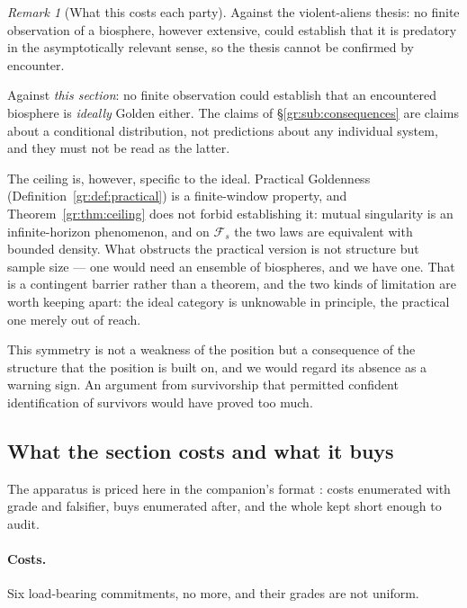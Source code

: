 \documentclass[11pt]{article}
\numberwithin{equation}{section}
\theoremstyle{plain}
\theoremstyle{definition}
\theoremstyle{remark}
\newtheorem{remark}[theorem]{Remark}
\begin{document}
\begin{remark}[What this costs each party]\label{gr:rem:evenhanded}
Against the violent-aliens thesis: no finite observation of a biosphere,
however extensive, could establish that it is predatory in the
asymptotically relevant sense, so the thesis cannot be confirmed by
encounter.

Against \emph{this section}: no finite observation could establish that
an encountered biosphere is \emph{ideally} Golden either. The claims of
\S\ref{gr:sub:consequences} are claims about a conditional
distribution, not predictions about any individual system, and they must
not be read as the latter.

The ceiling is, however, specific to the ideal. Practical Goldenness
(Definition~\ref{gr:def:practical}) is a finite-window property, and
Theorem~\ref{gr:thm:ceiling} does not forbid establishing it: mutual
singularity is an infinite-horizon phenomenon, and on $\mathcal F_s$ the
two laws are equivalent with bounded density. What obstructs the
practical version is not structure but sample size --- one would need an
ensemble of biospheres, and we have one. That is a contingent barrier
rather than a theorem, and the two kinds of limitation are worth keeping
apart: the ideal category is unknowable in principle, the practical one
merely out of reach.

This symmetry is not a weakness of the position but a consequence of the
structure that the position is built on, and we would regard its absence
as a warning sign. An argument from survivorship that permitted
confident identification of survivors would have proved too much.
\end{remark}

\subsection{What the section costs and what it buys}
\label{gr:sub:ledger}

The apparatus is priced here in the companion's format
\cite{Ben26Optimal}: costs enumerated with grade and falsifier, buys
enumerated after, and the whole kept short enough to audit.

\paragraph{Costs.} Six load-bearing commitments, no more, and their
grades are not uniform.
\end{document}
